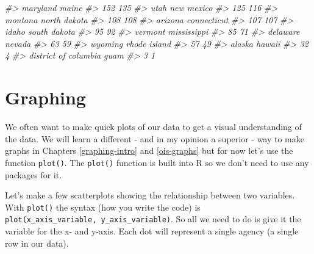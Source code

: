 \documentclass[
]{krantz}
\makeatletter
\newenvironment{Shaded}{\begin{snugshade}}{\end{snugshade}}
\newcommand{\CommentTok}[1]{\textcolor[rgb]{0.37,0.37,0.37}{\textit{#1}}}
\newenvironment{kframe}{%
\medskip{}
\setlength{\fboxsep}{.8em}
 \def\at@end@of@kframe{}%
 \ifinner\ifhmode%
  \def\at@end@of@kframe{\end{minipage}}%
  \begin{minipage}{\columnwidth}%
 \fi\fi%
 \def\FrameCommand##1{\hskip\@totalleftmargin \hskip-\fboxsep
 \colorbox{shadecolor}{##1}\hskip-\fboxsep
     \hskip-\linewidth \hskip-\@totalleftmargin \hskip\columnwidth}%
 \MakeFramed {\advance\hsize-\width
   \@totalleftmargin\z@ \linewidth\hsize
   \@setminipage}}%
 {\par\unskip\endMakeFramed%
 \at@end@of@kframe}
\renewenvironment{Shaded}{\begin{kframe}}{\end{kframe}}
\makeatother
\begin{document}
\begin{Shaded}
\begin{Highlighting}[]
\CommentTok{\#\textgreater{}             maryland                maine }
\CommentTok{\#\textgreater{}                  152                  135 }
\CommentTok{\#\textgreater{}                 utah           new mexico }
\CommentTok{\#\textgreater{}                  125                  116 }
\CommentTok{\#\textgreater{}              montana         north dakota }
\CommentTok{\#\textgreater{}                  108                  108 }
\CommentTok{\#\textgreater{}              arizona          connecticut }
\CommentTok{\#\textgreater{}                  107                  107 }
\CommentTok{\#\textgreater{}                idaho         south dakota }
\CommentTok{\#\textgreater{}                   95                   92 }
\CommentTok{\#\textgreater{}              vermont          mississippi }
\CommentTok{\#\textgreater{}                   85                   71 }
\CommentTok{\#\textgreater{}             delaware               nevada }
\CommentTok{\#\textgreater{}                   63                   59 }
\CommentTok{\#\textgreater{}              wyoming         rhode island }
\CommentTok{\#\textgreater{}                   57                   49 }
\CommentTok{\#\textgreater{}               alaska               hawaii }
\CommentTok{\#\textgreater{}                   32                    4 }
\CommentTok{\#\textgreater{} district of columbia                 guam }
\CommentTok{\#\textgreater{}                    3                    1}
\end{Highlighting}
\end{Shaded}

\hypertarget{graphing-1}{%
\section{Graphing}\label{graphing-1}}

We often want to make quick plots of our data to get a
visual understanding of the data. We will learn a different
- and in my opinion a superior - way to make graphs in
Chapters \ref{graphing-intro} and \ref{ois-graphs} but for
now let's use the function \texttt{plot()}. The
\texttt{plot()} function is built into R so we don't need to
use any packages for it.

Let's make a few scatterplots showing the relationship
between two variables. With \texttt{plot()} the syntax (how
you write the code) is
\texttt{plot(x\_axis\_variable,\ y\_axis\_variable)}. So all
we need to do is give it the variable for the x- and y-axis.
Each dot will represent a single agency (a single row in our
data).
\end{document}
